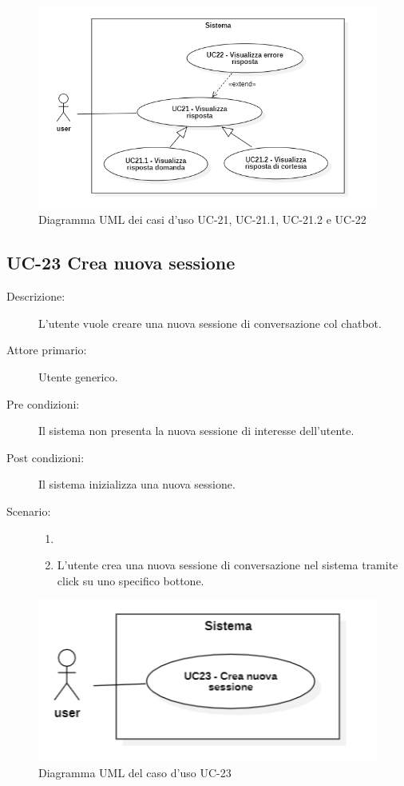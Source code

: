 \begin{figure}[H]
    \centering
    \includegraphics[width=0.77\linewidth]{UC21-22.PNG} 
    \caption{Diagramma UML dei casi d'uso UC-21, UC-21.1, UC-21.2 e UC-22}
\end{figure}

\subsection{UC-23 Crea nuova sessione}
\begin{description}
    \item[Descrizione:] L'utente vuole creare una nuova sessione di conversazione col chatbot.
    \item[Attore primario:] Utente generico.
    \item[Pre condizioni:] Il sistema non presenta la nuova sessione di interesse dell'utente.
    \item[Post condizioni:] Il sistema inizializza una nuova sessione.
    \item[Scenario:] 
    \begin{enumerate}
        \item[]
        \item L'utente crea una nuova sessione di conversazione nel sistema tramite click su uno specifico bottone. %
    \end{enumerate}
\end{description}

\begin{figure}[H]
    \centering
    \includegraphics[width=0.8\linewidth]{UC23.PNG} 
    \caption{Diagramma UML del caso d'uso UC-23}
\end{figure}


